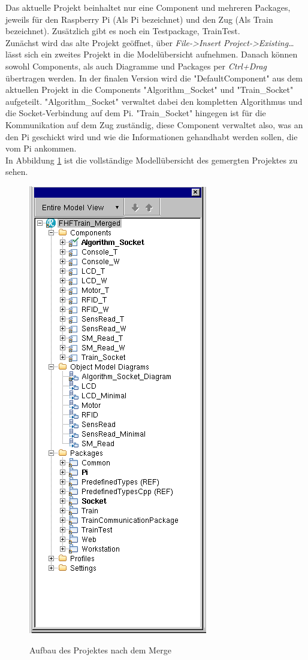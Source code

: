 Das aktuelle Projekt beinhaltet nur eine Component und mehreren Packages, jeweils für den Raspberry Pi (Als Pi bezeichnet) und den Zug (Als Train bezeichnet). Zusätzlich gibt es noch ein Testpackage, TrainTest.\\
Zunächst wird das alte Projekt geöffnet, über \textit{File->Insert Project->Existing…} lässt sich ein zweites Projekt in die Modelübersicht aufnehmen. Danach können sowohl Components, als auch Diagramme und Packages per \textit{Ctrl+Drag} übertragen werden. In der finalen Version wird die "DefaultComponent" aus dem aktuellen Projekt in die Components "Algorithm\_Socket" und "Train\_Socket" aufgeteilt. "Algorithm\_Socket" verwaltet dabei den kompletten Algorithmus und die Socket-Verbindung auf dem Pi. "Train\_Socket" hingegen ist für die Kommunikation auf dem Zug zuständig, diese Component verwaltet also, was an den Pi geschickt wird und wie die Informationen gehandhabt werden sollen, die vom Pi ankommen.\\
In Abbildung \ref{pic:train_structure_merged} ist die vollständige Modellübersicht des gemergten Projektes zu sehen.
\begin{figure}
	\caption{Aufbau des Projektes nach dem Merge}
	\includegraphics[height=0.8\textheight]{content/pictures/train/structure_merged.png}
	\label{pic:train_structure_merged}
\end{figure}
\clearpage
